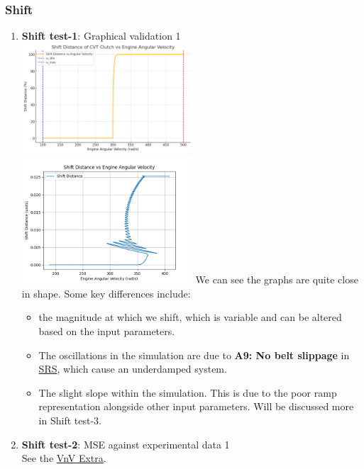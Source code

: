 \documentclass[12pt, titlepage]{article}
\begin{document}
\subsubsection{Shift}
\begin{enumerate}
\item{\textbf{Shift test-1}: Graphical validation 1}\\

\includegraphics[width=0.5\textwidth]{theoretical-figures/shift_vs_engine.png}
\includegraphics[width=0.5\textwidth]{simulation-figures/shift_distance_vs_engine_velocity.png}
We can see the graphs are quite close in shape. Some key differences include:
\begin{itemize}
  \item the magnitude at which we shift, which is variable and can be altered based on the input parameters.
  \item The oscillations in the simulation are due to \textbf{A9: No belt slippage} in \href{https://github.com/gr812b/CVT-Simulator/blob/develop/docs/SRS/SRS.pdf}{SRS}, which cause an underdamped system.
  \item The slight slope within the simulation. This is due to the poor ramp representation alongside other input parameters. Will be discussed more in Shift test-3.
\end{itemize}


\item{\textbf{Shift test-2}: MSE against experimental data 1}\\
See the \href{https://github.com/gr812b/CVT-Simulator/blob/develop/docs/VnVExtra/VnVExtra.pdf}{VnV Extra}.


\end{enumerate}
\end{document}
